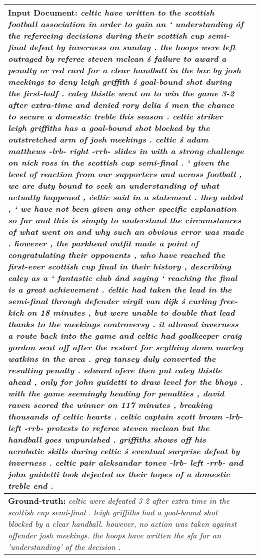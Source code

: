 \documentclass[11pt,a4paper]{article}
\begin{document}
\begin{figure*}
\centering
\begin{tabularx}{\textwidth}{|X|l|}
\hline
\textbf{Input Document:} \emph{celtic have written to the scottish football association in order to gain an ` understanding \' of the refereeing decisions during their scottish cup semi-final defeat by inverness on sunday . the hoops were left outraged by referee steven mclean \'s failure to award a penalty or red card for a clear handball in the box by josh meekings to deny leigh griffith \'s goal-bound shot during the first-half . caley thistle went on to win the game 3-2 after extra-time and denied rory delia \'s men the chance to secure a domestic treble this season . celtic striker leigh griffiths has a goal-bound shot blocked by the outstretched arm of josh meekings . celtic \'s adam matthews -lrb- right -rrb- slides in with a strong challenge on nick ross in the scottish cup semi-final . ` given the level of reaction from our supporters and across football , we are duty bound to seek an understanding of what actually happened , \' celtic said in a statement . they added , ` we have not been given any other specific explanation so far and this is simply to understand the circumstances of what went on and why such an obvious error was made . \' however , the parkhead outfit made a point of congratulating their opponents , who have reached the first-ever scottish cup final in their history , describing caley as a ` fantastic club \' and saying ` reaching the final is a great achievement . \' celtic had taken the lead in the semi-final through defender virgil van dijk \'s curling free-kick on 18 minutes , but were unable to double that lead thanks to the meekings controversy . it allowed inverness a route back into the game and celtic had goalkeeper craig gordon sent off after the restart for scything down marley watkins in the area . greg tansey duly converted the resulting penalty . edward ofere then put caley thistle ahead , only for john guidetti to draw level for the bhoys . with the game seemingly heading for penalties , david raven scored the winner on 117 minutes , breaking thousands of celtic hearts . celtic captain scott brown -lrb- left -rrb- protests to referee steven mclean but the handball goes unpunished . griffiths shows off his acrobatic skills during celtic \'s eventual surprise defeat by inverness . celtic pair aleksandar tonev -lrb- left -rrb- and john guidetti look dejected as their hopes of a domestic treble end .} \\ 
\hline
\textbf{Ground-truth:} \emph{\colorbox{dollarbill}{celtic} were defeated 3-2 after extra-time in the \colorbox{dollarbill}{scottish cup} semi-final . \colorbox{dollarbill}{leigh griffiths} had a goal-bound shot blocked by a clear handball. however, no action was taken against offender \colorbox{dollarbill}{josh meekings}. the \colorbox{dollarbill}{hoops} have written the \colorbox{dollarbill}{sfa} for an 'understanding' of the decision .} \\


\end{tabularx}
\end{figure*}
\end{document}
